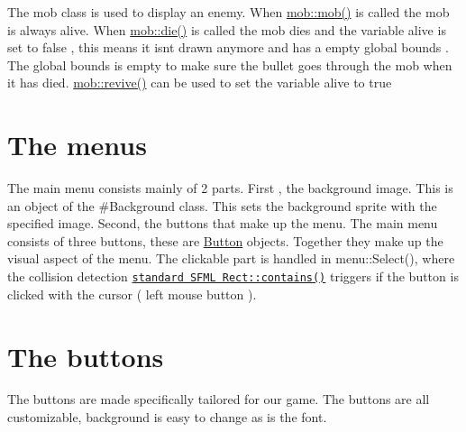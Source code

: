 The mob class is used to display an enemy. When \hyperlink{classmob_ac524dd40986df00721239b66c552437e}{mob\+::mob()} is called the mob is always alive. When \hyperlink{classmob_ae892b3ce84f4aa16411b385abb5410c8}{mob\+::die()} is called the mob dies and the variable alive is set to false , this means it isn\textquotesingle{}t drawn anymore and has a empty global bounds . The global bounds is empty to make sure the bullet goes through the mob when it has died. \hyperlink{classmob_a3bce6c06653881f8be86fbc60a2b67cb}{mob\+::revive()} can be used to set the variable alive to true\hypertarget{index_menu}{}\section{The menu\textquotesingle{}s}\label{index_menu}
The main menu consists mainly of 2 parts. First , the background image. This is an object of the \#\+Background class. This sets the background sprite with the specified image. Second, the buttons that make up the menu. The main menu consists of three buttons, these are \hyperlink{class_button}{Button} objects. Together they make up the visual aspect of the menu. The clickable part is handled in menu\+::\+Select(), where the collision detection \href{https://www.sfml-dev.org/documentation/2.0/classsf_1_1Rect.php#aa8a5364c84de6dd5299f833b54e31ef1 }{\tt standard S\+F\+ML Rect\+::contains()} triggers if the button is clicked with the cursor ( left mouse button ).\hypertarget{index_Button}{}\section{The buttons}\label{index_Button}
The buttons are made specifically tailored for our game. The buttons are all customizable, background is easy to change as is the font.

